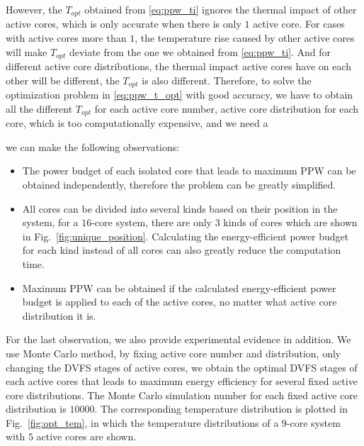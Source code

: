 However, the $T_{opt}$ obtained from \eqref{eq:ppw_ti} ignores the thermal impact of other active cores, which is only accurate when there is only $1$ active core. For cases with active cores more than $1$, the temperature rise caused by other active cores will make $T_{opt}$ deviate from the one we obtained from \eqref{eq:ppw_ti}. And for different active core distributions, the thermal impact active cores have on each other will be different, the $T_{opt}$ is also different. Therefore, to solve the optimization problem in \eqref{eq:ppw_t_opt} with good accuracy, we have to obtain all the different $T_{opt}$ for each active core number, active core distribution for each core, which is too computationally expensive, and we need a 

 we can make the following observations:
\begin{itemize}
\item The power budget of each isolated core that leads to maximum PPW can be obtained independently, therefore the problem can be greatly simplified.
\item All cores can be divided into several kinds based on their position in the system, for a $16$-core system, there are only $3$ kinds of cores which are shown in Fig.~\ref{fig:unique_position}. Calculating the energy-efficient power budget for each kind instead of all cores can also greatly reduce the computation time.
\item Maximum PPW can be obtained if the calculated energy-efficient power budget is applied to each of the active cores, no matter what active core distribution it is. 
\end{itemize}




For the last observation, we also provide experimental evidence in addition. We use Monte Carlo method, by fixing active core number and distribution, only changing the DVFS stages of active cores, we obtain the optimal DVFS stages of each active cores that leads to maximum energy efficiency for several fixed active core distributions. The Monte Carlo simulation number for each fixed active core distribution is $10000$. The corresponding temperature distribution is plotted in Fig.~\ref{fig:opt_tem}, in which the temperature distributions of a $9$-core system with $5$ active cores are shown. 

